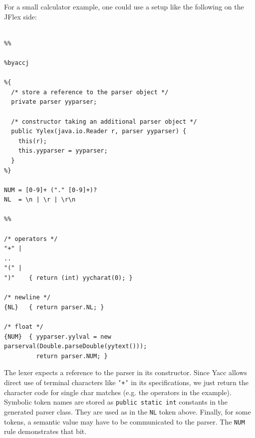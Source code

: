 \documentclass[11pt]{scrartcl}
\newcommand{\xsmall}{\small}
\begin{document}
For a small calculator example, one could use a setup like the 
following on the JFlex side:

{\xsmall\begin{verbatim}

%%

%byaccj

%{
  /* store a reference to the parser object */
  private parser yyparser;

  /* constructor taking an additional parser object */
  public Yylex(java.io.Reader r, parser yyparser) {
    this(r);
    this.yyparser = yyparser;
  }
%}

NUM = [0-9]+ ("." [0-9]+)?
NL  = \n | \r | \r\n

%%

/* operators */
"+" | 
..
"(" | 
")"    { return (int) yycharat(0); }

/* newline */
{NL}   { return parser.NL; }

/* float */
{NUM}  { yyparser.yylval = new parserval(Double.parseDouble(yytext()));
         return parser.NUM; }
\end{verbatim}
}

The lexer expects a reference to the parser in its constructor.
Since Yacc allows direct use of terminal characters like \texttt{'+'}
in its specifications, we just return the character code for
single char matches (e.g. the operators in the example). Symbolic
token names are stored as \texttt{public static int} constants in
the generated parser class. They are used as in the \texttt{NL} token
above. Finally, for some tokens, a semantic value may have to be 
communicated to the parser. The \texttt{NUM} rule demonstrates that
bit.
\end{document}
